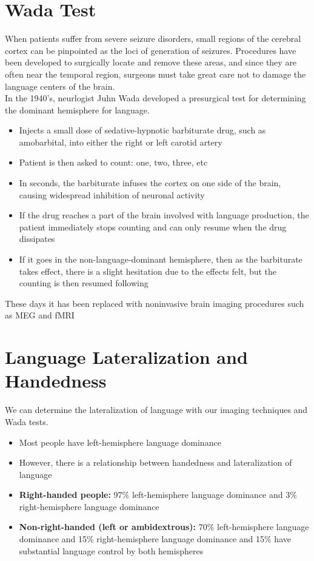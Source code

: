 \documentclass{article}
\begin{document}
\section{Wada Test}
When patients suffer from severe seizure disorders, small regions of the cerebral cortex can be pinpointed as the loci of generation of seizures. Procedures have been developed to surgically locate and remove these areas, and since they are often near the temporal region, surgeons must take great care not to damage the language centers of the brain. \\ 

\noindent In the 1940's, neurlogist Juhn Wada developed a presurgical test for determining the dominant hemisphere for language. 

\begin{itemize}
    \item Injects a small dose of sedative-hypnotic barbiturate drug, such as amobarbital, into either the right or left carotid artery
    \item Patient is then asked to count: one, two, three, etc
    \item In seconds, the barbiturate infuses the cortex on one side of the brain, causing widespread inhibition of neuronal activity
    \item If the drug reaches a part of the brain involved with language production, the patient immediately stops counting and can only resume when the drug dissipates
    \item If it goes in the non-language-dominant hemisphere, then as the barbiturate takes effect, there is a slight hesitation due to the effects felt, but the counting is then resumed following
\end{itemize}
These days it has been replaced with noninvasive brain imaging procedures such as MEG and fMRI

\section{Language Lateralization and Handedness}
We can determine the lateralization of language with our imaging techniques and Wada tests. 

\begin{itemize}
    \item Most people have left-hemisphere language dominance
    \item However, there is a relationship between handedness and lateralization of language
    \item \textbf{Right-handed people:} 97\% left-hemisphere language dominance and 3\% right-hemisphere language dominance
    \item \textbf{Non-right-handed (left or ambidextrous):} 70\% left-hemisphere language dominance and 15\% right-hemisphere language dominance and 15\% have substantial language control by both hemispheres
\end{itemize}
\end{document}
